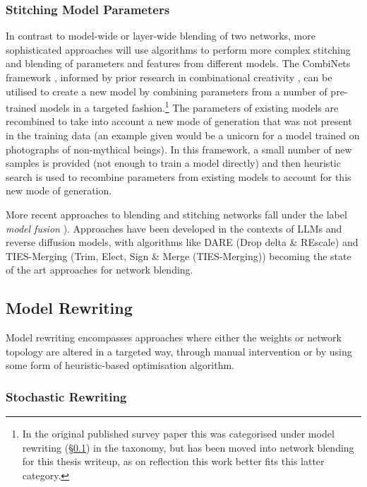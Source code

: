 \subsubsection{Stitching Model Parameters} 

In contrast to model-wide or layer-wide blending of two networks, more sophisticated approaches will use algorithms to perform more complex stitching and blending of parameters and features from different models.
The CombiNets framework \citep{guzdial2018combinets}, informed by prior research in combinational creativity \citep{boden2004creative}, can be utilised to create a new model by combining parameters from a number of pre-trained models in a targeted fashion.\footnote{In the original published survey paper \citep{broad2021active} this was categorised under model rewriting (\S \ref{survey:rewriting}) in the taxonomy, but has been moved into network blending for this thesis writeup, as on reflection this work better fits this latter category.} 
The parameters of existing models are recombined to take into account a new mode of generation that was not present in the training data (an example given would be a unicorn for a model trained on photographs of non-mythical beings). 
In this framework, a small number of new samples is provided (not enough to train a model directly) and then heuristic search is used to recombine parameters from existing models to account for this new mode of generation.

More recent approaches to blending and stitching networks fall under the label \textit{model fusion} \citep{li2023deep}).
Approaches have been developed in the contexts of LLMs and reverse diffusion models, with algorithms like DARE (Drop delta \& REscale) \citep{yu2024language} and TIES-Merging (Trim, Elect, Sign \& Merge (TIES-Merging)) becoming the state of the art approaches for network blending.

\subsection{Model Rewriting}
\label{survey:rewriting}

Model rewriting encompasses approaches where either the weights or network topology are altered in a targeted way, through manual intervention or by using some form of heuristic-based optimisation algorithm. 

\subsubsection{Stochastic Rewriting} 

